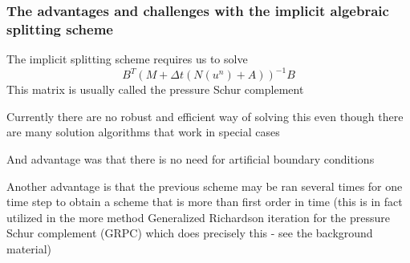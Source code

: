 \begin{frame}
\frametitle{The advantages and challenges with the implicit  algebraic splitting scheme}

The implicit splitting scheme requires us to solve 
\[
B^T (M + \Delta t (N(u^n)  +  A)) ^{-1} B  
\]
This matrix is usually called the pressure Schur complement 

\vspace{0.3cm}
Currently there are no robust and efficient way of solving this even though 
there are many solution algorithms that work in special cases

\vspace{0.3cm}
And advantage was that there is no need for artificial boundary conditions

\vspace{0.3cm}
Another advantage is that the previous scheme may be ran several times for one 
time step to obtain a scheme that is more than first order in time
(this is in fact utilized in the more method
Generalized Richardson iteration for the pressure Schur complement (GRPC) which 
does precisely this - see the background material)   



\end{frame}

